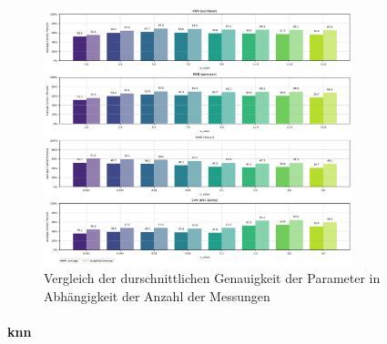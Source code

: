 \begin{figure}[H]
    \centering
    \includegraphics[width=0.8\textwidth]{images/05_best_parameters_all_03.png}
    \caption{Vergleich der durschnittlichen Genauigkeit der Parameter in Abhängigkeit der Anzahl der Messungen}
    \label{fig:05_best_parameters_all_03}
\end{figure}




\paragraph{\gls{knn}}


